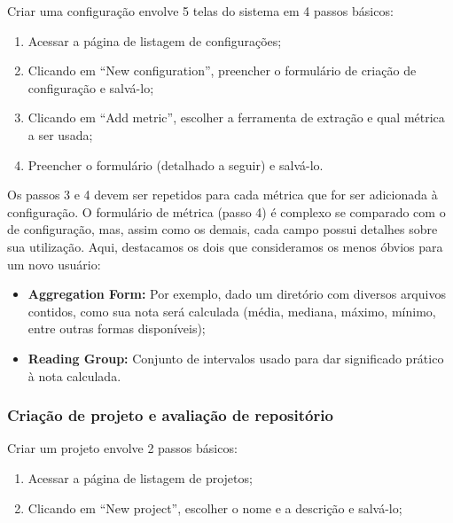\documentclass[12pt]{article}
\begin{document}
    Criar uma configuração envolve 5 telas do sistema em 4 passos básicos:
    \begin{enumerate}
      \item Acessar a página de listagem de configurações;
      \item Clicando em ``New configuration'', preencher o formulário de criação de configuração e salvá-lo;
      \item Clicando em ``Add metric'', escolher a ferramenta de extração e qual métrica a ser usada;
      \item Preencher o formulário (detalhado a seguir) e salvá-lo.
    \end{enumerate}

    Os passos 3 e 4 devem ser repetidos para cada métrica que for ser adicionada à configuração. O formulário de métrica (passo 4) é complexo se comparado com o de configuração, mas, assim como os demais, cada campo possui detalhes sobre sua utilização. Aqui, destacamos os dois que consideramos os menos óbvios para um novo usuário:
    \begin{itemize}
      \item \textbf{Aggregation Form:} Por exemplo, dado um diretório com diversos arquivos contidos, como sua nota será calculada (média, mediana, máximo, mínimo, entre outras formas disponíveis);
      \item \textbf{Reading Group:} Conjunto de intervalos usado para dar significado prático à nota calculada.
    \end{itemize}

    \subsubsection{Criação de projeto e avaliação de repositório}

    Criar um projeto envolve 2 passos básicos:
    \begin{enumerate}
      \item Acessar a página de listagem de projetos;
      \item Clicando em ``New project'', escolher o nome e a descrição e salvá-lo;
    \end{enumerate}
\end{document}

